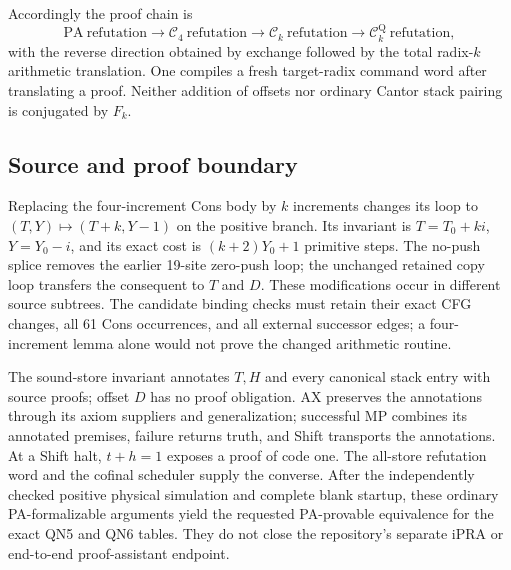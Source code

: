 Accordingly the proof chain is
\[
 \mathrm{PA\ refutation}\longrightarrow\mathcal C_4\mathrm{\ refutation}
 \longrightarrow\mathcal C_k\mathrm{\ refutation}
 \longrightarrow\mathcal C_k^{\mathrm Q}\mathrm{\ refutation},
\]
with the reverse direction obtained by exchange followed by the total
radix-$k$ arithmetic translation. One compiles a fresh target-radix
command word after translating a proof. Neither addition of offsets nor
ordinary Cantor stack pairing is conjugated by $F_k$.

\subsection{Source and proof boundary}
Replacing the four-increment Cons body by $k$ increments changes its loop
to $(T,Y)\mapsto(T+k,Y-1)$ on the positive branch. Its invariant is
$T=T_0+ki$, $Y=Y_0-i$, and its exact cost is $(k+2)Y_0+1$ primitive
steps. The no-push splice removes the earlier 19-site zero-push loop;
the unchanged retained copy loop transfers the consequent to $T$ and $D$.
These modifications occur in different source subtrees. The candidate
binding checks must retain their exact CFG changes, all 61 Cons occurrences,
and all external successor edges; a four-increment lemma alone would not
prove the changed arithmetic routine.

The sound-store invariant annotates $T,H$ and every canonical stack entry
with source proofs; offset $D$ has no proof obligation. AX preserves the
annotations through its axiom suppliers and generalization; successful MP
combines its annotated premises, failure returns truth, and Shift transports
the annotations. At a Shift halt, $t+h=1$ exposes a proof of code one.
The all-store refutation word and the cofinal scheduler supply the converse.
After the independently checked positive physical simulation and complete
blank startup, these ordinary PA-formalizable arguments yield the requested
PA-provable equivalence for the exact QN5 and QN6 tables. They do not close
the repository's separate iPRA or end-to-end proof-assistant endpoint.
